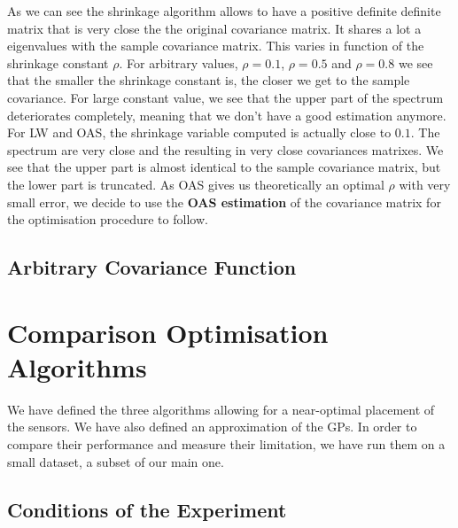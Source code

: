 As we can see the shrinkage algorithm allows to have a positive definite definite matrix that is very close the the original covariance matrix. It shares a lot a eigenvalues with the sample covariance matrix. This varies in function of the shrinkage constant $\rho$. For arbitrary values, $\rho = 0.1$,  $\rho= 0.5$ and  $\rho= 0.8$ we see that the smaller the shrinkage constant is, the closer we get to the sample covariance. For large constant value, we see that the upper part of the spectrum deteriorates completely, meaning that we don't have a good estimation anymore.  \\

For LW and OAS, the shrinkage variable computed is actually close to $0.1$. The spectrum are very close and the resulting in very close covariances matrixes. We see that the upper part is almost identical to the sample covariance matrix, but the lower part is truncated. As OAS gives us theoretically an optimal $\rho$ with very small error, we decide to use the \textbf{OAS estimation} of the covariance matrix for the optimisation procedure to follow.


\subsection{Arbitrary Covariance Function}







\section{Comparison Optimisation Algorithms}

We have defined the three algorithms allowing for a near-optimal placement of the sensors. We have also defined an approximation of the GPs. In order to compare their performance and measure their limitation, we have run them on a small dataset, a subset of our main one. 
\subsection{Conditions of the Experiment}

